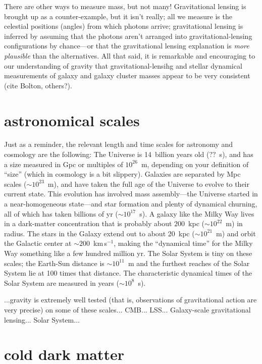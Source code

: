 \documentclass[12pt]{article}
\begin{document}
There are other ways to measure mass, but not many!  Gravitational
lensing is brought up as a counter-example, but it isn't really; all
we measure is the celestial positions (angles) from which photons
arrive; gravitational lensing is inferred by assuming that the photons
aren't arranged into gravitational-lensing configurations by
chance---or that the gravitational lensing explanation is \emph{more
  plausible} than the alternatives.  All that said, it is remarkable
and encouraging to our understanding of gravity that
gravitational-lensihg and stellar dynamical measurements of galaxy and
galaxy cluster masses appear to be very consistent (cite Bolton,
others?).

\section{astronomical scales}

Just as a reminder, the relevant length and time scales for astronomy
and cosmology are the following: The Universe is 14~billion years old
($??$~s), and has a size measured in Gpc or multiples of $10^{26}$~m,
depending on your definition of ``size'' (which in cosmology is a bit
slippery).  Galaxies are separated by Mpc scales ($\sim 10^{23}$~m),
and have taken the full age of the Universe to evolve to their current
state.  This evolution has involved mass assembly---the Universe
started in a near-homogeneous state---and star formation and plenty of
dynamical churning, all of which has taken billions of yr ($\sim
10^17$~s).  A galaxy like the Milky Way lives in a dark-matter
concentration that is probably about $200$~kpc ($\sim 10^{22}$~m) in
radius.  The stars in the Galaxy extend out to about 20~kpc ($\sim
10^{21}$~m) and orbit the Galactic center at $\sim 200$~km\,s$^{-1}$,
making the ``dynamical time'' for the Milky Way something like a few
hundred million yr.  The Solar System is tiny on these scales; the
Earth-Sun distance is $\sim 10^{11}$~m and the furthest reaches of the
Solar System lie at 100 times that distance.  The characteristic
dynamical times of the Solar System are measured in years ($\sim
10^8$~s).

...gravity is extremely well tested (that is, observations of
gravitational action are very precise) on some of these
scales... CMB... LSS... Galaxy-scale gravitational lensing... Solar
System...

\section{cold dark matter}
\end{document}
